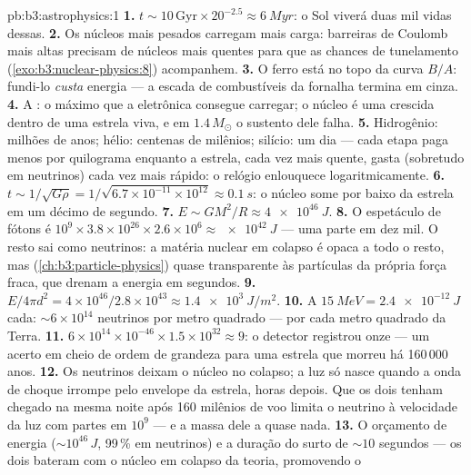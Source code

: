 \begin{solution}{pb:b3:astrophysics:1}
\textbf{1.} $t \sim 10\,\text{Gyr}\times20^{-2.5} \approx
\qty{6}{Myr}$: o Sol viverá duas mil vidas dessas.
\textbf{2.} Os núcleos mais pesados carregam mais carga: barreiras de
Coulomb mais altas precisam de núcleos mais quentes para que as chances
de tunelamento (\cref{exo:b3:nuclear-physics:8}) acompanhem.
\textbf{3.} O ferro está no topo da curva $B/A$: fundi-lo
\emph{custa} energia --- a escada de combustíveis da fornalha termina em cinza.
\textbf{4.} A : o máximo que a  eletrônica consegue carregar; o núcleo é uma 
crescida dentro de uma estrela viva, e em $1.4\,M_\odot$ o sustento dele falha.
\textbf{5.} Hidrogênio: milhões de anos; hélio: centenas de milênios;
silício: um dia --- cada etapa paga menos por quilograma enquanto a
estrela, cada vez mais quente, gasta (sobretudo em neutrinos) cada vez
mais rápido: o relógio enlouquece logaritmicamente.
\textbf{6.} $t \sim 1/\sqrt{G\rho} =
1/\sqrt{6.7\times10^{-11}\times10^{12}} \approx \qty{0.1}{s}$:
o núcleo some por baixo da estrela em um décimo de segundo.
\textbf{7.} $E \sim GM^2/R \approx \qty{4e46}{J}$.
\textbf{8.} O espetáculo de fótons é $10^9\times3.8\times10^{26}
\times2.6\times10^{6} \approx \qty{e42}{J}$ --- uma parte em dez
mil. O resto sai como neutrinos: a matéria nuclear em colapso
é opaca a todo o resto, mas
(\cref{ch:b3:particle-physics}) quase transparente às partículas da
própria força fraca, que drenam a energia em segundos.
\textbf{9.} $E/4\pi d^2 = 4\times10^{46}/2.8\times10^{43}
\approx \qty{1.4e3}{J/m^2}$.
\textbf{10.} A $\qty{15}{MeV} = \qty{2.4e-12}{J}$ cada:
${\sim}6\times10^{14}$ neutrinos por metro quadrado --- por
cada metro quadrado da Terra.
\textbf{11.} $6\times10^{14}\times10^{-46}\times1.5\times
10^{32} \approx 9$: o detector registrou onze --- um acerto em
cheio de ordem de grandeza para uma estrela que morreu há 160\,000
anos.
\textbf{12.} Os neutrinos deixam o núcleo no colapso; a
luz só nasce quando a onda de choque irrompe pelo envelope da
estrela, horas depois. Que os dois tenham chegado na mesma noite após
160 milênios de voo limita o neutrino à velocidade da luz
com partes em $10^{9}$ --- e a massa dele a quase nada.
\textbf{13.} O orçamento de energia ($\sim10^{46}\,\unit{J}$, 99\,\%
em neutrinos) e a duração do surto de ${\sim}10$ segundos ---
os dois bateram com o núcleo em colapso da teoria, promovendo o

\end{solution}
